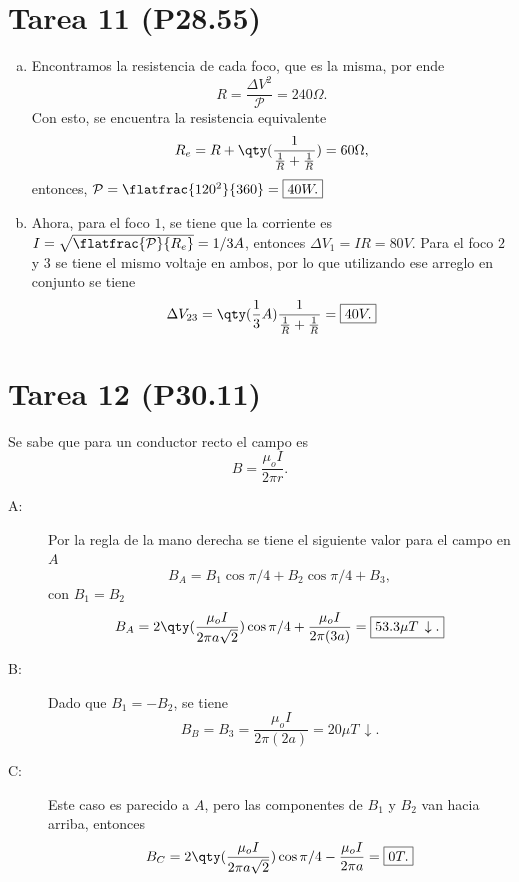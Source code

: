 \section*{Tarea 11 (P28.55)}

\begin{enumerate}[a)]
	\item Encontramos la resistencia de cada foco, que es la misma, por ende
			$$ R = \frac{\Delta V ^2}{\mathcal{P}} = 240 \Omega . $$
		Con esto, se encuentra la resistencia equivalente
			$$ R_e = R + \qty(\frac{1}{\frac{1}{R} + \frac{1}{R}}) = 60\Omega , $$
		entonces, $\mathcal{P} = \flatfrac{120^2}{360} = \boxed{40W.}$
	\item Ahora, para el foco $1$, se tiene que la corriente es $I = \sqrt{\flatfrac{\mathcal{P}}{R_e}} = 1/3 A$, entonces $\Delta V_1 = I R = \boxed{80V}$. Para el foco $2$ y $3$ se tiene el mismo voltaje en ambos, por lo que utilizando ese arreglo en conjunto se tiene
		$$ \Delta V_{23} = \qty(\frac{1}{3} A) \frac{1}{\frac{1}{R} + \frac{1}{R}} = \boxed{40V.} $$
\end{enumerate}















\section*{Tarea 12 (P30.11)}

Se sabe que para un conductor recto el campo es
	$$ B = \frac{\mu _o I}{2\pi r}. $$
\begin{description}
	\item[A:] Por la regla de la mano derecha se tiene el siguiente valor para el campo en $A$
		$$ B_A = B_1 \cos{\pi /4} + B_2 \cos{\pi /4} + B_3, $$
			con $B_1 = B_2$
				$$ B_A = 2\qty(\frac{\mu _o I}{2\pi a\sqrt{2}}) \cos{\pi /4} + \frac{\mu _o I}{2\pi (3a)} = \boxed{ 53.3\mu T \, \downarrow . } $$
	\item[B:] Dado que $B_1 = -B_2$, se tiene
		$$ B_B = B_3 = \frac{\mu _o I}{2\pi (2a)} = \boxed{ 20\mu T \, \downarrow . } $$
	\item[C:] Este caso es parecido a $A$, pero las componentes de $B_1$ y $B_2$ van hacia arriba, entonces
		$$ B_C = 2\qty(\frac{\mu _o I}{2\pi a\sqrt{2}}) \cos{\pi /4} - \frac{\mu _o I}{2\pi a} = \boxed{ 0T. } $$
\end{description}













